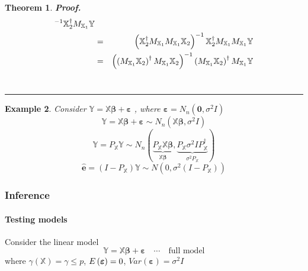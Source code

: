 \documentclass{article}
\newtheorem{theorem}{Theorem}
\newtheorem{example}[theorem]{Example}
\newenvironment{proof}[1][Proof]{\noindent\textbf{#1.} }{\ \rule{0.5em}{0.5em}}
\begin{document}
\begin{theorem}
\begin{proof}
\begin{eqnarray*}
^{-1}\mathbb{X}_{2}^{\dagger }M_{\mathbb{X}_{1}}\mathbb{Y} \\
&=&\left( \mathbb{X}_{2}^{\dagger }M_{\mathbb{X}_{1}}M_{\mathbb{X}_{1}}%
\mathbb{X}_{2}\right) ^{-1}\mathbb{X}_{2}^{\dagger }M_{\mathbb{X}_{1}}M_{%
\mathbb{X}_{1}}\mathbb{Y} \\
&=&\left( \left( M_{\mathbb{X}_{1}}\mathbb{X}_{2}\right) ^{\dagger }M_{%
\mathbb{X}_{1}}\mathbb{X}_{2}\right) ^{-1}\left( M_{\mathbb{X}_{1}}\mathbb{X}%
_{2}\right) ^{\dagger }M_{\mathbb{X}_{1}}\mathbb{Y}
\end{eqnarray*}
\end{proof}
\end{theorem}

\bigskip

\begin{example}
Consider $\mathbb{Y}=\mathbb{X}\boldsymbol{\beta }+\boldsymbol{\varepsilon }$%
, where $\boldsymbol{\varepsilon }=N_{n}\left( \boldsymbol{0},\sigma
^{2}I\right) $%
\begin{equation*}
\mathbb{Y}=\mathbb{X}\boldsymbol{\beta }+\boldsymbol{\varepsilon }\sim
N_{n}\left( \mathbb{X}\boldsymbol{\beta },\sigma ^{2}I\right) 
\end{equation*}%
\begin{equation*}
\mathbb{\hat{Y}}=P_{\mathbb{X}}\mathbb{Y}\sim N_{n}\left( \underset{\mathbb{X%
}\boldsymbol{\beta }}{\underbrace{P_{\mathbb{X}}\mathbb{X}\boldsymbol{\beta }%
}},\underset{\sigma ^{2}P_{\mathbb{X}}}{\underbrace{P_{\mathbb{X}}\sigma
^{2}IP_{\mathbb{X}}^{\dagger }}}\right) 
\end{equation*}%
\begin{equation*}
\boldsymbol{\hat{e}}=\left( I-P_{\mathbb{X}}\right) \mathbb{Y}\sim N\left(
0,\sigma ^{2}\left( I-P_{\mathbb{X}}\right) \right) 
\end{equation*}
\end{example}

\bigskip 

\subsubsection{Inference}

\paragraph{Testing models}

\bigskip

Consider the linear model 
\begin{equation*}
\mathbb{Y}=\mathbb{X}\boldsymbol{\beta }+\boldsymbol{\varepsilon \quad }%
\cdots \boldsymbol{\quad }\text{full model}
\end{equation*}%
where $\gamma \left( \mathbb{X}\right) =\gamma \leq p$, $E\left( \boldsymbol{%
\varepsilon }\right) =0$, $Var\left( \boldsymbol{\varepsilon }\right)
=\sigma ^{2}I$
\end{document}
